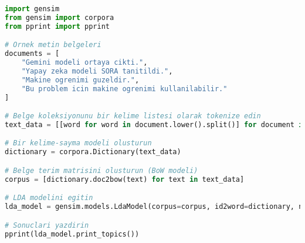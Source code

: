 \begin{lstlisting}[language=Python]
import gensim
from gensim import corpora
from pprint import pprint

# Ornek metin belgeleri
documents = [
    "Gemini modeli ortaya cikti.",
    "Yapay zeka modeli SORA tanitildi.",
    "Makine ogrenimi guzeldir.",
    "Bu problem icin makine ogrenimi kullanilabilir."
]

# Belge koleksiyonunu bir kelime listesi olarak tokenize edin
text_data = [[word for word in document.lower().split()] for document in documents]

# Bir kelime-sayma modeli olusturun
dictionary = corpora.Dictionary(text_data)

# Belge terim matrisini olusturun (BoW modeli)
corpus = [dictionary.doc2bow(text) for text in text_data]

# LDA modelini egitin
lda_model = gensim.models.LdaModel(corpus=corpus, id2word=dictionary, num_topics=2, passes=10)

# Sonuclari yazdirin
pprint(lda_model.print_topics())
\end{lstlisting}

\newpage